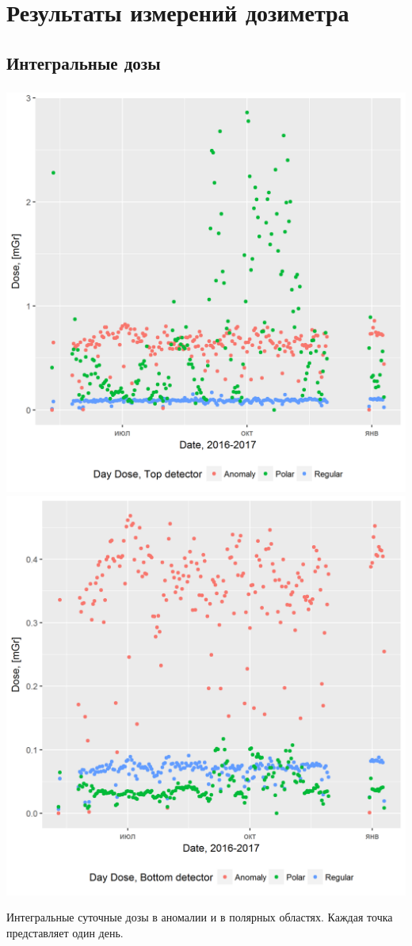 \documentclass[t, aspectratio=43]{beamer}
\begin{document}
\section{Результаты измерений дозиметра}
\subsection{Интегральные дозы}

\begin{frame}	
\frametitle{\insertsection} 
\framesubtitle{\insertsubsection} 

\begin{center}
	\includegraphics[width=0.5\linewidth]{ressumdaydose1}
	\includegraphics[width=0.5\linewidth]{ressumdaydose2}
\end{center}

{\tiny Интегральные суточные дозы в аномалии и в полярных областях. Каждая точка представляет один день. 
	
}
\end{frame}
\end{document}
